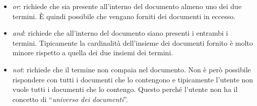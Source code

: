 \begin{itemize}
	\item \textit{or}: richiede che sia presente all'interno del documento almeno uno dei due termini. \`{E} quindi possibile che vengano forniti dei documenti in eccesso.
	\item \textit{and}: richiede che all'interno del documento siano presenti i entrambi i termini. Tipicamente la cardinalità dell'insieme dei documenti fornito è molto minore rispetto a quella dei due insiemi dei termini.
	\item \textit{not}: richiede che il termine non compaia nel documento. Non è però possibile rispondere con tutti i documenti che lo contengono e tipicamente l'utente non vuole tutti i documenti che lo contengo. Questo perché l'utente non ha il concetto di ``\textit{universo dei documenti}''.
\end{itemize}























